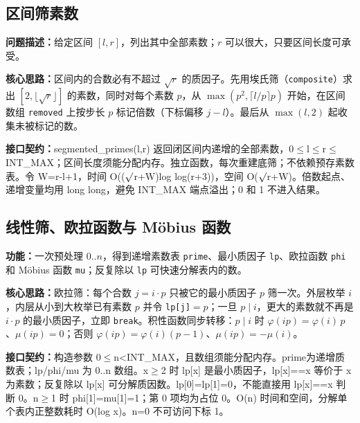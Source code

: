 \subsection{区间筛素数}\label{compact-segmented_primes}

\noindent\textbf{问题描述：}\allowbreak 给定区间 $[l,r]$，列出其中全部素数；$r$ 可以很大，只要区间长度可承受。

\textbf{核心思路：}\allowbreak 区间内的合数必有不超过 $\sqrt r$ 的质因子。先用埃氏筛（\texttt{composite}）求出 $[2,\lfloor\sqrt r\rfloor]$ 的素数，同时对每个素数 $p$，从 $\max(p^2,\lceil l/p\rceil p)$ 开始，在区间数组 \texttt{removed} 上按步长 $p$ 标记倍数（下标偏移 $j-l$）。最后从 $\max(l,2)$ 起收集未被标记的数。



{\sloppy{}\noindent\textbf{接口契约：}segmented\_primes(l,r) 返回闭区间内递增的全部素数，0$\le$l$\le$r$\le$INT\_MAX；区间长度须能分配内存。独立函数，每次重建底筛；不依赖预存素数表。令 W=r-l+1，时间 O(($\sqrt{\vphantom x}$r+W)log log(r+3))，空间 O($\sqrt{\vphantom x}$r+W)。倍数起点、递增变量均用 long long，避免 INT\_MAX 端点溢出；0 和 1 不进入结果。\par}



\Needspace{571pt}

\subsection{线性筛、欧拉函数与 Möbius 函数}\label{compact-LinearSieve}

\noindent\textbf{功能：}\allowbreak 一次预处理 $0..n$，得到递增素数表 \texttt{prime}、最小质因子 \texttt{lp}、欧拉函数 \texttt{phi} 和 Möbius 函数 \texttt{mu}；反复除以 \texttt{lp} 可快速分解表内的数。

\textbf{核心思路：}\allowbreak 欧拉筛：每个合数 $j=i\cdot p$ 只被它的最小质因子 $p$ 筛一次。外层枚举 $i$，内层从小到大枚举已有素数 $p$ 并令 \texttt{lp[j]}$=p$；一旦 $p\mid i$，更大的素数就不再是 $i\cdot p$ 的最小质因子，立即 \texttt{break}。积性函数同步转移：$p\mid i$ 时 $\varphi(ip)=\varphi(i)\,p$、$\mu(ip)=0$；否则 $\varphi(ip)=\varphi(i)(p-1)$、$\mu(ip)=-\mu(i)$。



{\sloppy{}\noindent\textbf{接口契约：}构造参数 0$\le$n<INT\_MAX，且数组须能分配内存。prime为递增质数表；lp/phi/mu 为 0..n 数组。x$\ge$2 时 lp[x] 是最小质因子，lp[x]==x 等价于 x 为素数；反复除以 lp[x] 可分解质因数。lp[0]=lp[1]=0，不能直接用 lp[x]==x 判断 0。n$\ge$1 时 phi[1]=mu[1]=1；第 0 项均为占位 0。O(n) 时间和空间，分解单个表内正整数耗时 O(log x)。n=0 不可访问下标 1。\par}

